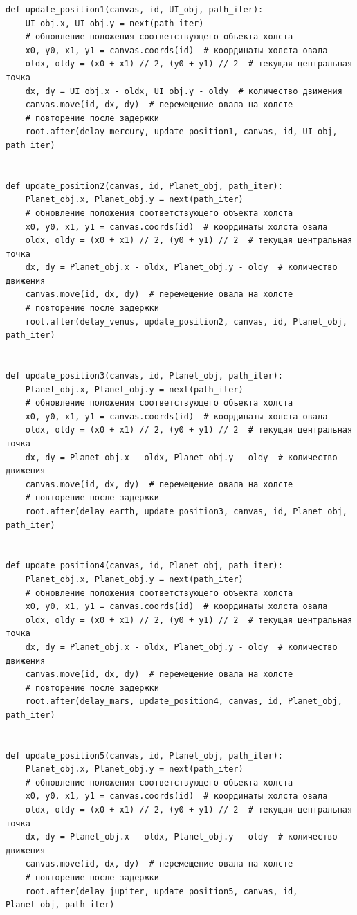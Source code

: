 \documentclass[11pt,a4paper]{report}
\begin{document}
\begin{verbatim}
def update_position1(canvas, id, UI_obj, path_iter):
    UI_obj.x, UI_obj.y = next(path_iter)  
    # обновление положения соответствующего объекта холста
    x0, y0, x1, y1 = canvas.coords(id)  # координаты холста овала
    oldx, oldy = (x0 + x1) // 2, (y0 + y1) // 2  # текущая центральная точка
    dx, dy = UI_obj.x - oldx, UI_obj.y - oldy  # количество движения
    canvas.move(id, dx, dy)  # перемещение овала на холсте
    # повторение после задержки
    root.after(delay_mercury, update_position1, canvas, id, UI_obj, path_iter)


def update_position2(canvas, id, Planet_obj, path_iter):
    Planet_obj.x, Planet_obj.y = next(path_iter) 
    # обновление положения соответствующего объекта холста
    x0, y0, x1, y1 = canvas.coords(id)  # координаты холста овала
    oldx, oldy = (x0 + x1) // 2, (y0 + y1) // 2  # текущая центральная точка
    dx, dy = Planet_obj.x - oldx, Planet_obj.y - oldy  # количество движения
    canvas.move(id, dx, dy)  # перемещение овала на холсте
    # повторение после задержки
    root.after(delay_venus, update_position2, canvas, id, Planet_obj, path_iter)


def update_position3(canvas, id, Planet_obj, path_iter):
    Planet_obj.x, Planet_obj.y = next(path_iter)  
    # обновление положения соответствующего объекта холста
    x0, y0, x1, y1 = canvas.coords(id)  # координаты холста овала
    oldx, oldy = (x0 + x1) // 2, (y0 + y1) // 2  # текущая центральная точка
    dx, dy = Planet_obj.x - oldx, Planet_obj.y - oldy  # количество движения
    canvas.move(id, dx, dy)  # перемещение овала на холсте
    # повторение после задержки
    root.after(delay_earth, update_position3, canvas, id, Planet_obj, path_iter)


def update_position4(canvas, id, Planet_obj, path_iter):
    Planet_obj.x, Planet_obj.y = next(path_iter)  
    # обновление положения соответствующего объекта холста
    x0, y0, x1, y1 = canvas.coords(id)  # координаты холста овала
    oldx, oldy = (x0 + x1) // 2, (y0 + y1) // 2  # текущая центральная точка
    dx, dy = Planet_obj.x - oldx, Planet_obj.y - oldy  # количество движения
    canvas.move(id, dx, dy)  # перемещение овала на холсте
    # повторение после задержки
    root.after(delay_mars, update_position4, canvas, id, Planet_obj, path_iter)


def update_position5(canvas, id, Planet_obj, path_iter):
    Planet_obj.x, Planet_obj.y = next(path_iter) 
    # обновление положения соответствующего объекта холста
    x0, y0, x1, y1 = canvas.coords(id)  # координаты холста овала
    oldx, oldy = (x0 + x1) // 2, (y0 + y1) // 2  # текущая центральная точка
    dx, dy = Planet_obj.x - oldx, Planet_obj.y - oldy  # количество движения
    canvas.move(id, dx, dy)  # перемещение овала на холсте
    # повторение после задержки
    root.after(delay_jupiter, update_position5, canvas, id, Planet_obj, path_iter)



\end{verbatim}
\end{document}
